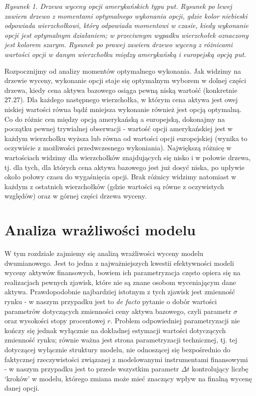 \documentclass[
]{article}
\begin{document}
\emph{Rysunek 1. Drzewa wyceny opcji amerykańskich typu put. Rysunek po
lewej zawiera drzewo z momentami optymalnego wykonania opcji, gdzie
kolor niebieski odpowiada wierzchołkowi, który odpowiada momentowi w
czasie, kiedy wykonanie opcji jest optymalnym działaniem; w przeciwnym
wypadku wierzchołek oznaczony jest kolorem szarym. Rysunek po prawej
zawiera drzewo wyceny z różnicami wartości opcji w danym wierzchołku
między amerykańską i europejską opcją put.}

Rozpocznijmy od analizy momentów optymalnego wykonania. Jak widzimy na
drzewie wyceny, wykonanie opcji staje się optymalnym wyborem w dolnej
części drzewa, kiedy cena aktywa bazowego osiąga pewną niską wartość
(konkretnie \(27.27\)). Dla każdego następnego wierzchołka, w którym
cena aktywa jest owej niskiej wartości równa bądź mniejsza wykonanie
również jest opcją optymalną. Co do różnic cen między opcją amerykańską
a europejską, dokonajmy na początku pewnej trywialnej obserwacji -
wartość opcji amerykańskiej jest w każdym wierzchołku wyższa lub równa
od wartości opcji europejskiej (wynika to oczywiście z możliwości
przedwczesnego wykoniania). Największą różnicę w wartościach widzimy dla
wierzchołków znajdujących się nisko i w połowie drzewa, tj. dla tych,
dla których cena aktywa bazowego jest już dosyć niska, po upływie około
połowy czasu do wygaśnięcia opcji. Brak różnicy widzimy natomiast w
każdym z ostatnich wierzchołków (gdzie wartości są równe z oczywistych
względów) oraz w górnej części drzewa wyceny.

\hypertarget{analiza-wraux17cliwoux15bci-modelu}{%
\section{Analiza wrażliwości
modelu}\label{analiza-wraux17cliwoux15bci-modelu}}

W tym rozdziale zajmiemy się analizą wrażliwości wyceny modelu
dwumianowego. Jest to jedna z najważniejszych kwestii efektywności
modeli wyceny aktywów finansowych, bowiem ich parametryzacja często
opiera się na realizacjach pewnych zjawisk, które nie są znane osobom
wyceniającym dane aktywa. Prawdopodobnie najbardziej istotnym z tych
zjawisk jest zmienność rynku - w naszym przypadku jest to \emph{de
facto} pytanie o dobór wartości parametrów dotyczących zmienności ceny
aktywa bazowego, czyli parametr \(\sigma\) oraz wysokości stopy
procentowej \(r\). Problem odpowiedniej parametryzacji nie kończy się
jednak wyłącznie na dokładnej estymacji wartości dotyczących zmienność
rynku; równie ważna jest strona parametryzacji technicznej, tj. tej
dotyczącej wyłącznie struktury modelu, nie odnoszącej się bezpośrednio
do faktycznej rzeczywistości związanej z modelowanymi instrumentami
finansowymi - w naszym przypadku jest to przede wszystkim parametr
\(\Delta t\) kontrolujący liczbę `kroków' w modelu, którego zmiana może
mieć znaczący wpływ na finalną wycenę danej opcji.
\end{document}
